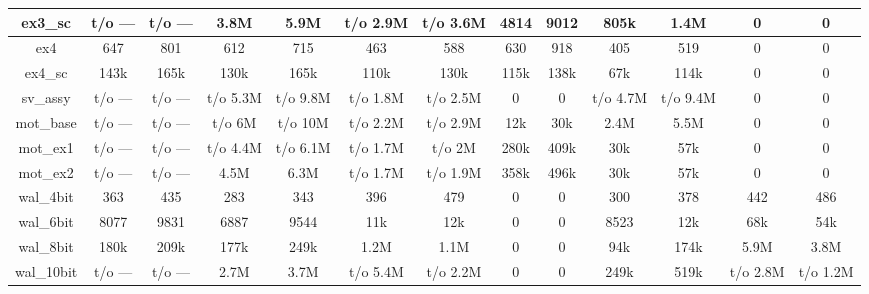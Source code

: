 \begin{sidewaystable}[t]
\begin{tabular}{|c|c|c|c|c|c|c|c|c|c|c|c|c|}
ex3\_sc        & t/o ---        & t/o ---       & 3.8M         & 5.9M         & t/o 2.9M    & t/o 3.6M    & 4814           & 9012          & 805k          & 1.4M         & 0              & 0              \\ \hline
ex4         & 647            & 801           & 612             & 715             & 463            & 588            & 630            & 918           & 405             & 519             & 0              & 0              \\ \hline
ex4\_sc      & 143k         & 165k        & 130k          & 165k          & 110k         & 130k         & 115k         & 138k        & 67k           & 114k          & 0              & 0              \\ \hline
sv\_assy              & t/o ---        & t/o ---       & t/o 5.3M     & t/o 9.8M     & t/o 1.8M    & t/o 2.5M    & 0              & 0             & t/o 4.7M     & t/o 9.4M     & 0              & 0              \\ \hline
mot\_base   & t/o ---        & t/o ---       & t/o 6M     & t/o 10M    & t/o 2.2M    & t/o 2.9M    & 12k          & 30k         & 2.4M         & 5.5M         & 0              & 0              \\ \hline
mot\_ex1 & t/o ---        & t/o ---       & t/o 4.4M     & t/o 6.1M     & t/o 1.7M    & t/o 2M    & 280k         & 409k        & 30k           & 57k           & 0              & 0              \\ \hline
mot\_ex2 & t/o ---        & t/o ---       & 4.5M         & 6.3M         & t/o 1.7M    & t/o 1.9M    & 358k         & 496k        & 30k           & 57k           & 0              & 0              \\ \hline \hline
wal\_4bit  & 363            & 435           & 283             & 343             & 396            & 479            & 0              & 0             & 300             & 378             & 442            & 486            \\ \hline
wal\_6bit  & 8077           & 9831          & 6887            & 9544            & 11k          & 12k          & 0              & 0             & 8523            & 12k           & 68k          & 54k          \\ \hline
wal\_8bit  & 180k         & 209k        & 177k          & 249k          & 1.2M        & 1.1M        & 0              & 0             & 94k           & 174k          & 5.9M        & 3.8M        \\ \hline
wal\_10bit & t/o ---        & t/o ---       & 2.7M         & 3.7M         & t/o 5.4M    & t/o 2.2M    & 0              & 0             & 249k          & 519k          & t/o 2.8M    & t/o 1.2M    \\ \hline

\end{tabular}
\end{sidewaystable}
